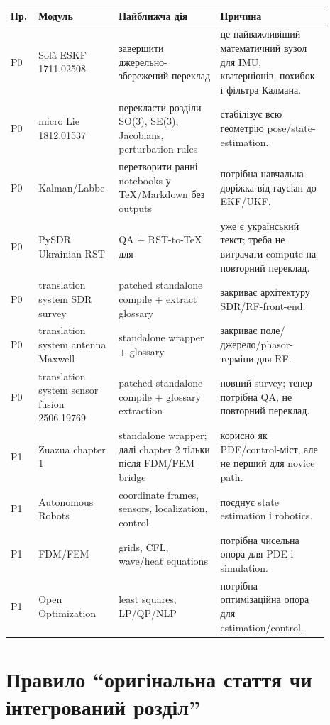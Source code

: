 \begin{longtable}{L{0.07\linewidth}L{0.20\linewidth}L{0.30\linewidth}L{0.32\linewidth}}
\toprule
\textbf{Пр.} & \textbf{Модуль} & \textbf{Найближча дія} & \textbf{Причина}\\
\midrule
P0 & Solà ESKF 1711.02508 & завершити джерельно-збережений переклад  & це найважливіший математичний вузол для IMU, кватерніонів, похибок і фільтра Калмана.\\
P0 & micro Lie 1812.01537 & перекласти розділи SO(3), SE(3), Jacobians, perturbation rules & стабілізує всю геометрію pose/state-estimation.\\
P0 & Kalman/Labbe & перетворити ранні notebooks у TeX/Markdown без outputs & потрібна навчальна доріжка від гаусіан до EKF/UKF.\\
P0 & PySDR Ukrainian RST & QA + RST-to-TeX для  & уже є український текст; треба не витрачати compute на повторний переклад.\\
P0 & translation system SDR survey & patched standalone compile + extract glossary & закриває архітектуру SDR/RF-front-end.\\
P0 & translation system antenna Maxwell & standalone wrapper + glossary & закриває поле/джерело/phasor-терміни для RF.\\
P0 & translation system sensor fusion 2506.19769 & patched standalone compile + glossary extraction & повний survey; тепер потрібна QA, не повторний переклад.\\
P1 & Zuazua chapter 1 & standalone wrapper; далі chapter 2 тільки після FDM/FEM bridge & корисно як PDE/control-міст, але не перший для novice path.\\
P1 & Autonomous Robots & coordinate frames, sensors, localization, control & поєднує state estimation і robotics.\\
P1 & FDM/FEM & grids, CFL, wave/heat equations & потрібна чисельна опора для PDE і simulation.\\
P1 & Open Optimization & least squares, LP/QP/NLP & потрібна оптимізаційна опора для estimation/control.\\
\bottomrule
\end{longtable}

\section{Правило ``оригінальна стаття чи інтегрований розділ''}

